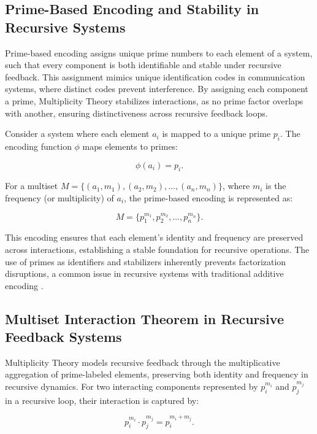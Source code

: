 \documentclass{article}
\begin{document}
\subsection{Prime-Based Encoding and Stability in Recursive Systems}

Prime-based encoding assigns unique prime numbers to each element of a system, such that every component is both identifiable and stable under recursive feedback. This assignment mimics unique identification codes in communication systems, where distinct codes prevent interference. By assigning each component a prime, Multiplicity Theory stabilizes interactions, as no prime factor overlaps with another, ensuring distinctiveness across recursive feedback loops.

Consider a system where each element \( a_i \) is mapped to a unique prime \( p_i \). The encoding function \( \phi \) maps elements to primes:

\begin{equation}
\phi(a_i) = p_i.
\end{equation}

For a multiset \( M = \{(a_1, m_1), (a_2, m_2), \ldots, (a_n, m_n)\} \), where \( m_i \) is the frequency (or multiplicity) of \( a_i \), the prime-based encoding is represented as:

\begin{equation}
M = \{p_1^{m_1}, p_2^{m_2}, \ldots, p_n^{m_n}\}.
\end{equation}

This encoding ensures that each element's identity and frequency are preserved across interactions, establishing a stable foundation for recursive operations. The use of primes as identifiers and stabilizers inherently prevents factorization disruptions, a common issue in recursive systems with traditional additive encoding \citep{gauss1801, freeman2004}.

\subsection{Multiset Interaction Theorem in Recursive Feedback Systems}

Multiplicity Theory models recursive feedback through the multiplicative aggregation of prime-labeled elements, preserving both identity and frequency in recursive dynamics. For two interacting components represented by \( p_i^{m_i} \) and \( p_j^{m_j} \) in a recursive loop, their interaction is captured by:

\begin{equation}
p_i^{m_i} \cdot p_j^{m_j} = p_i^{m_i + m_j}.
\end{equation}
\end{document}
